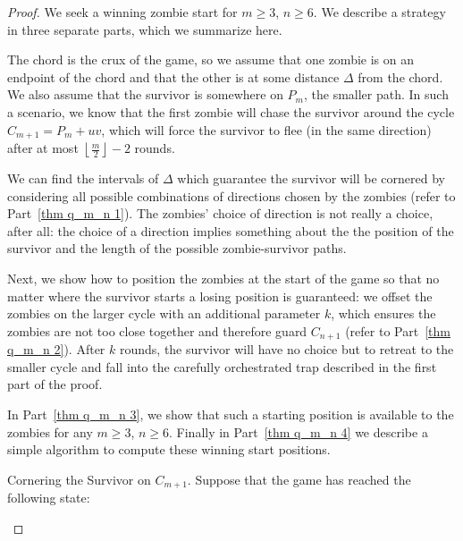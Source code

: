 \begin{proof}
  We seek a winning zombie start for $m \geq 3$, $n \geq 6$.
  We describe a strategy in three separate parts, which we summarize here.

  The chord is the crux of the game, so we assume that one zombie is on an endpoint of the chord and that the other is at some distance $\Delta$ from the chord.
  We also assume that the survivor is somewhere on $P_m$, the smaller path.
  In such a scenario, we know that the first zombie will chase the survivor around the cycle
  $C_{m+1} = P_m + uv$, which will force the survivor to flee (in the same direction) after at most $\left\lfloor \frac{m}{2} \right\rfloor -2$ rounds.

  We can find the intervals of $\Delta$ which guarantee the survivor will be cornered by considering all possible combinations of directions chosen by the zombies (refer to Part~\ref{thm q_m_n 1}). The zombies' choice of direction is not really a choice, after all: the choice of a direction implies something about the
  the position of the survivor and the length of the possible zombie-survivor paths.

  Next, we show how to position the zombies at the start of the game so that
  no matter where the survivor starts a losing position is guaranteed:
  we offset the zombies on the larger cycle with an additional parameter $k$, which ensures the zombies are not too close together and therefore guard $C_{n+1}$ (refer to Part~\ref{thm q_m_n 2}). After $k$ rounds, the survivor will have no choice but to retreat to the smaller cycle and fall into the carefully
  orchestrated trap described in the first part of the proof.

  In Part~\ref{thm q_m_n 3}, we show that such a starting position is available to the zombies
  for any $m \geq 3$, $n \geq 6$. Finally in Part~\ref{thm q_m_n 4} we describe a simple algorithm to compute these winning start positions.

\begin{description}
  \item Cornering the Survivor on $C_{m+1}$. \label{thm q_m_n 1}
   Suppose that the game has reached the following state:


\end{description}
\end{proof}
